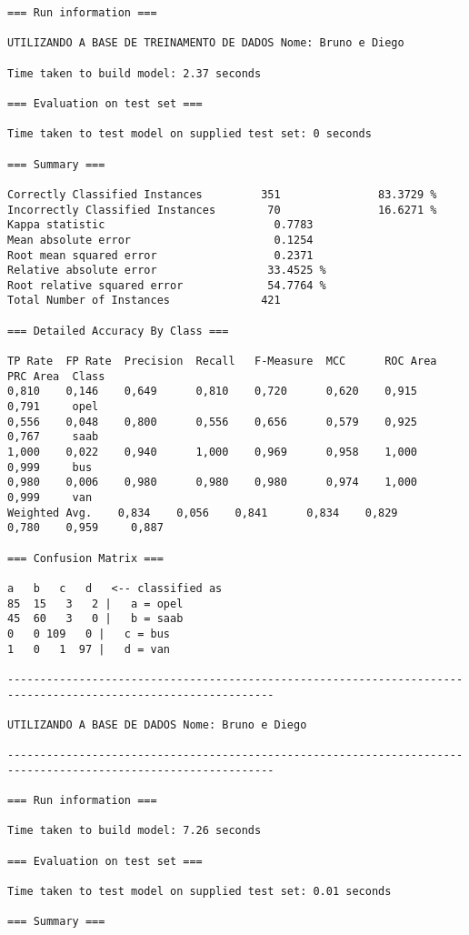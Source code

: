 \documentclass[
	article,			%
	11pt,				%
	oneside,			%
	a4paper,			%
	english,			%
	brazil,				%
	sumario=tradicional
	]{abntex2}
\begin{document}
\begin{lstlisting}
=== Run information ===

UTILIZANDO A BASE DE TREINAMENTO DE DADOS Nome: Bruno e Diego

Time taken to build model: 2.37 seconds

=== Evaluation on test set ===

Time taken to test model on supplied test set: 0 seconds

=== Summary ===

Correctly Classified Instances         351               83.3729 %
Incorrectly Classified Instances        70               16.6271 %
Kappa statistic                          0.7783
Mean absolute error                      0.1254
Root mean squared error                  0.2371
Relative absolute error                 33.4525 %
Root relative squared error             54.7764 %
Total Number of Instances              421     

=== Detailed Accuracy By Class ===

TP Rate  FP Rate  Precision  Recall   F-Measure  MCC      ROC Area  PRC Area  Class
0,810    0,146    0,649      0,810    0,720      0,620    0,915     0,791     opel
0,556    0,048    0,800      0,556    0,656      0,579    0,925     0,767     saab
1,000    0,022    0,940      1,000    0,969      0,958    1,000     0,999     bus
0,980    0,006    0,980      0,980    0,980      0,974    1,000     0,999     van
Weighted Avg.    0,834    0,056    0,841      0,834    0,829      0,780    0,959     0,887     

=== Confusion Matrix ===

a   b   c   d   <-- classified as
85  15   3   2 |   a = opel
45  60   3   0 |   b = saab
0   0 109   0 |   c = bus
1   0   1  97 |   d = van

---------------------------------------------------------------------------------------------------------------

UTILIZANDO A BASE DE DADOS Nome: Bruno e Diego

---------------------------------------------------------------------------------------------------------------

=== Run information ===

Time taken to build model: 7.26 seconds

=== Evaluation on test set ===

Time taken to test model on supplied test set: 0.01 seconds

=== Summary ===


\end{lstlisting}
\end{document}
